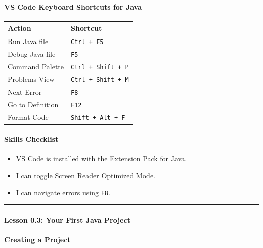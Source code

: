 \documentclass[
  justified,
  openright,
]{tufte-book}
\let\subsection\paragraph
\let\paragraph\paragraph
\let\subsection\paragraph
\let\paragraph\paragraph
\providecommand{\tightlist}{%
  \setlength{\itemsep}{0pt}\setlength{\parskip}{0pt}}
\begin{document}
\subsection{VS Code Keyboard Shortcuts for
Java}\label{vs-code-keyboard-shortcuts-for-java}

\begin{fullwidth}{\def\LTcaptype{none} %
\begin{longtable}[]{@{}ll@{}}
\toprule\noalign{}
Action & Shortcut \\
\midrule\noalign{}
\endhead
\bottomrule\noalign{}
\endlastfoot
Run Java file & \texttt{Ctrl\ +\ F5} \\
Debug Java file & \texttt{F5} \\
Command Palette & \texttt{Ctrl\ +\ Shift\ +\ P} \\
Problems View & \texttt{Ctrl\ +\ Shift\ +\ M} \\
Next Error & \texttt{F8} \\
Go to Definition & \texttt{F12} \\
Format Code & \texttt{Shift\ +\ Alt\ +\ F} \\
\end{longtable}
}
\end{fullwidth}

\subsection{Skills Checklist}\label{skills-checklist-68}

\begin{itemize}
\tightlist
\item[$\square$]
  VS Code is installed with the Extension Pack for Java.
\item[$\square$]
  I can toggle Screen Reader Optimized Mode.
\item[$\square$]
  I can navigate errors using \texttt{F8}.
\end{itemize}

\begin{center}\rule{0.5\linewidth}{0.5pt}\end{center}

\subsection{Lesson 0.3: Your First Java
Project}\label{lesson-0.3-your-first-java-project}

\subsection{Creating a Project}\label{creating-a-project}
\end{document}
